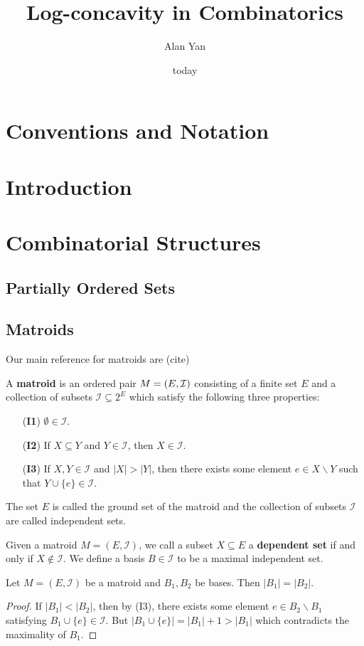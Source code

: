 \documentclass{puthesis-UG}
\author{Alan Yan}
\title{Log-concavity in Combinatorics}
\date{today}
\begin{document}
 
\chapter{Conventions and Notation}

\chapter{Introduction}

\chapter{Combinatorial Structures}

\section{Partially Ordered Sets}

\section{Matroids}

Our main reference for matroids are (cite)

\begin{defn}
	A \textbf{matroid} is an ordered pair $M = (E, \mathcal{I})$ consisting of a finite set $E$ and a collection of subsets $\mathcal{I} \subseteq 2^E$ which satisfy the following three properties:
	\begin{enumerate}
		\item[(\textbf{I1})] $\emptyset \in \mathcal{I}$.
		\item[(\textbf{I2})] If $X \subseteq Y$ and $Y \in \mathcal{I}$, then $X \in \mathcal{I}$. 
		\item[(\textbf{I3})] If $X, Y \in \mathcal{I}$ and $|X| > |Y|$, then there exists some element $e \in X \backslash Y$ such that $Y \cup \{e\} \in \mathcal{I}$. 
	\end{enumerate}
	The set $E$ is called the ground set of the matroid and the collection of subsets $\mathcal{I}$ are called independent sets. 
\end{defn}

Given a matroid $M = (E, \mathcal{I})$, we call a subset $X \subseteq E$ a \textbf{dependent set} if and only if $X \notin \mathcal{I}$. We define a basis $B \in \mathcal{I}$ to be a maximal independent set. 

\begin{prop}
	Let $M = (E, \mathcal{I})$ be a matroid and $B_1, B_2$ be bases. Then $|B_1| = |B_2|$. 
\end{prop}
\begin{proof}
	If $|B_1| < |B_2|$, then by (I3), there exists some element $e \in B_2 \backslash B_1$ satisfying $B_1 \cup \{e\} \in \mathcal{I}$. But $|B_1 \cup \{e\}| = |B_1| + 1 > |B_1|$ which contradicts the maximality of $B_1$. 
\end{proof}
\end{document}
